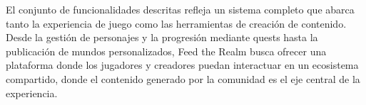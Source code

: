 \vspace{0.25cm}
El conjunto de funcionalidades descritas refleja un sistema completo que abarca tanto la experiencia de juego 
como las herramientas de creación de contenido. Desde la gestión de personajes y la progresión mediante quests 
hasta la publicación de mundos personalizados, Feed the Realm busca ofrecer una plataforma donde los jugadores 
y creadores puedan interactuar en un ecosistema compartido, donde el contenido generado por la comunidad es el 
eje central de la experiencia.